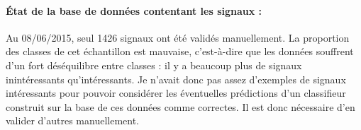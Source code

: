    \paragraph{État de la base de données contentant les signaux :}
        Au 08/06/2015, seul 1426 signaux ont été validés manuellement.
        La proportion des classes de cet échantillon est mauvaise, c'est-à-dire que les données souffrent d'un fort déséquilibre entre classes : il y a beaucoup plus de signaux inintéressants qu'intéressants. Je n'avait donc pas assez d'exemples de signaux intéressants pour pouvoir considérer les éventuelles prédictions d'un classifieur construit sur la base de ces données comme correctes. Il est donc nécessaire d'en valider d'autres manuellement.

